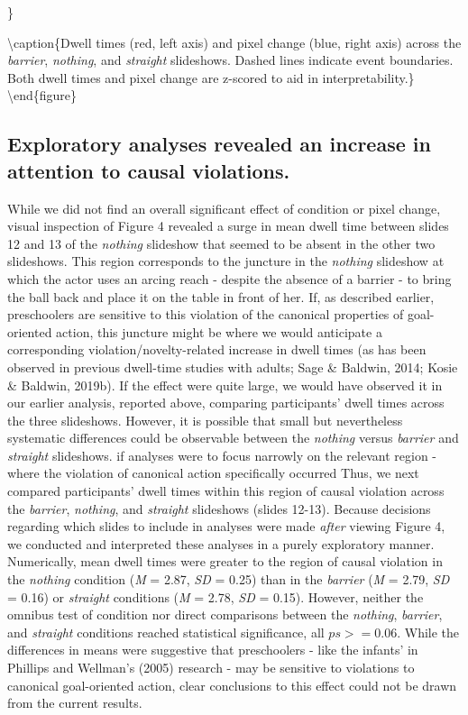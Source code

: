 \documentclass[
  english,
  man,floatsintext]{apa6}
\begin{document}
\}

\textbackslash caption\{Dwell times (red, left axis) and pixel change (blue, right axis) across the \emph{barrier}, \emph{nothing}, and \emph{straight} slideshows. Dashed lines indicate event boundaries. Both dwell times and pixel change are z-scored to aid in interpretability.\}\label{fig:fig4}
\textbackslash end\{figure\}

\hypertarget{exploratory-analyses-revealed-an-increase-in-attention-to-causal-violations.}{%
\subsection{Exploratory analyses revealed an increase in attention to causal violations.}\label{exploratory-analyses-revealed-an-increase-in-attention-to-causal-violations.}}

While we did not find an overall significant effect of condition or pixel change, visual inspection of Figure 4 revealed a surge in mean dwell time between slides 12 and 13 of the \emph{nothing} slideshow that seemed to be absent in the other two slideshows. This region corresponds to the juncture in the \emph{nothing} slideshow at which the actor uses an arcing reach - despite the absence of a barrier - to bring the ball back and place it on the table in front of her. If, as described earlier, preschoolers are sensitive to this violation of the canonical properties of goal-oriented action, this juncture might be where we would anticipate a corresponding violation/novelty-related increase in dwell times (as has been observed in previous dwell-time studies with adults; Sage \& Baldwin, 2014; Kosie \& Baldwin, 2019b). If the effect were quite large, we would have observed it in our earlier analysis, reported above, comparing participants' dwell times across the three slideshows. However, it is possible that small but nevertheless systematic differences could be observable between the \emph{nothing} versus \emph{barrier} and \emph{straight} slideshows. if analyses were to focus narrowly on the relevant region - where the violation of canonical action specifically occurred Thus, we next compared participants' dwell times within this region of causal violation across the \emph{barrier}, \emph{nothing}, and \emph{straight} slideshows (slides 12-13). Because decisions regarding which slides to include in analyses were made \emph{after} viewing Figure 4, we conducted and interpreted these analyses in a purely exploratory manner. Numerically, mean dwell times were greater to the region of causal violation in the \emph{nothing} condition (\emph{M} = 2.87, \emph{SD} = 0.25) than in the \emph{barrier} (\emph{M} = 2.79, \emph{SD} = 0.16) or \emph{straight} conditions (\emph{M} = 2.78, \emph{SD} = 0.15). However, neither the omnibus test of condition nor direct comparisons between the \emph{nothing}, \emph{barrier}, and \emph{straight} conditions reached statistical significance, all \(ps >=0.06\). While the differences in means were suggestive that preschoolers - like the infants' in Phillips and Wellman's (2005) research - may be sensitive to violations to canonical goal-oriented action, clear conclusions to this effect could not be drawn from the current results.
\end{document}
